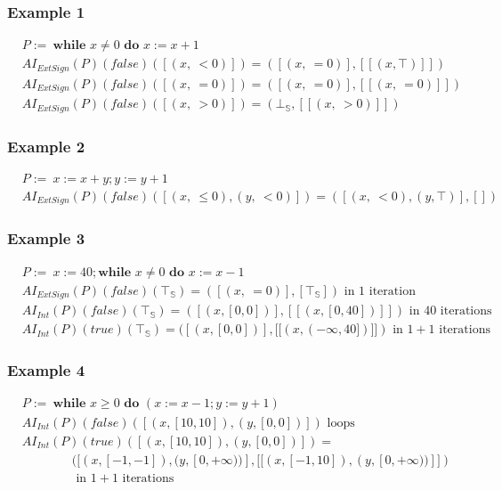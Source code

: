\documentclass{beamer}
\begin{document}
\begin{frame}
    \frametitle{Example 1}
    \begin{align*}
        &P :=\ \textbf {while } x \ne 0 \textbf { do } x := x + 1 \\
        &AI_{ExtSign} (P) (false) ([(x,\ < 0)]) = ([(x,\ = 0)], [[(x, \top)]]) \\
        &AI_{ExtSign} (P) (false) ([(x,\ = 0)]) = ([(x,\ = 0)], [[(x,\ = 0)]]) \\
        &AI_{ExtSign} (P) (false) ([(x,\ > 0)]) = (\bot_\mathbb{S}, [[(x,\ > 0)]]) 
    \end{align*}
\end{frame}

\begin{frame}
    \frametitle{Example 2}
    \begin{align*}
        &P :=\ x := x + y; y := y + 1 \\
        &AI_{ExtSign} (P) (false) ([(x,\ \le 0), (y,\ < 0)]) = ([(x,\ < 0), (y,\top)], [])
    \end{align*}
\end{frame}

\begin{frame}
    \frametitle{Example 3}
    \begin{align*}
        &P :=\ x := 40; \textbf {while } x \ne 0 \textbf { do } x := x - 1 \\
        &AI_{ExtSign} (P) (false) (\top_\mathbb{S}) = ([(x,\ = 0)], [\top_\mathbb{S}]) \text{ in $1$ iteration}\\
        &AI_{Int} (P) (false) (\top_\mathbb{S}) = ([(x, [0, 0])], [[(x, [0, 40])]]) \text{ in $40$ iterations}\\
        &AI_{Int} (P) (true) (\top_\mathbb{S}) = ([(x, [0, 0])], [[(x, (-\infty, 40])]]) \text{ in $1 + 1$ iterations}
    \end{align*}
\end{frame}

\begin{frame}
    \frametitle{Example 4}
    \begin{align*}
        &P :=\ \textbf {while } x \ge 0 \textbf { do } (x := x - 1; y := y + 1) \\
        &AI_{Int} (P) (false) ([(x, [10, 10]), (y, [0, 0])]) \text{ loops} \\
        &AI_{Int} (P) (true) ([(x, [10, 10]), (y, [0, 0])]) =\\
        & \qquad \qquad ([(x, [-1, -1]), (y, [0, +\infty))], [[(x, [-1, 10]), (y, [0, +\infty))]]) \\
        & \qquad \qquad \text{ in $1 + 1$ iterations}
    \end{align*}
\end{frame}
\end{document}
